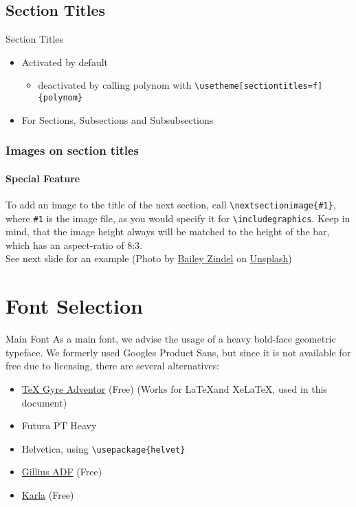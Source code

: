\documentclass[fragile]{beamer}
\begin{document}
\subsection{Section Titles}
\begin{frame}[fragile=singleslide]{Section Titles}
  \begin{itemize}
  \item Activated by default
    \begin{itemize}
    \item deactivated by calling polynom with \verb|\usetheme[sectiontitles=f]{polynom}|
    \end{itemize}
  \item For Sections, Subsections and Subsubsections
  \end{itemize}
\end{frame}

\begin{frame}[fragile=singleslide]
  \frametitle{Images on section titles}
  \framesubtitle{Special Feature}
  To add an image to the title of the next section, call
  \verb|\nextsectionimage{#1}|, where
  \verb|#1| is the image file, as you would specify it
  for \verb|\includegraphics|. Keep in mind, that the image height
  \alert{always} will be matched to the height of the bar, which has
  an aspect-ratio of 8:3.\\

  See next slide for an example (Photo by \href{https://unsplash.com/photos/NRQV-hBF10M}{Bailey Zindel} on \href{https://unsplash.com/}{Unsplash})
\end{frame}

\section{Font Selection}
\begin{frame}[fragile=singleslide]{Main Font}
  As a main font, we advise the usage of a heavy bold-face geometric typeface.  
  We formerly used Googles Product Sans, but since it is not available for free
  due to licensing, there are several alternatives:  
  \begin{itemize}
  \item \href{http://www.tug.dk/FontCatalogue/texgyreadventor/}{\TeX
    Gyre Adventor} (Free) (Works for \LaTeX and Xe\LaTeX, used in this document)
  \item Futura PT Heavy
  \item Helvetica, using \verb|\usepackage{helvet}|
  \item \href{https://www.1001fonts.com/gillius-adf-font.html}{Gillius
      ADF} (Free)
  \item \href{https://fonts.google.com/specimen/Karla}{Karla} (Free)
  \end{itemize}
\end{frame}
\end{document}

